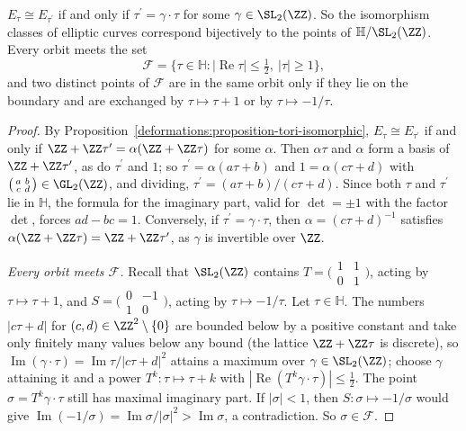 \begin{theorem}\label{deformations:theorem-elliptic-moduli}
$E_\tau \cong E_{\tau^{\prime}}$ if and only if $\tau^{\prime} = \gamma\cdot\tau$ for some $\gamma \in \SL_2(\ZZ)$. So the isomorphism classes of elliptic curves correspond bijectively to the points of
$\mathbb{H}/\SL_2(\ZZ)$. Every orbit meets the set
\[
\mathcal{F} = \{\tau \in \mathbb{H} : |\operatorname{Re}\tau| \leq \tfrac12, \ |\tau| \geq 1\},
\]
and two distinct points of $\mathcal{F}$ are in the same orbit only if they lie on the boundary and are exchanged by $\tau \mapsto \tau + 1$ or by $\tau \mapsto -1/\tau$.
\end{theorem}

\begin{proof}
By Proposition~\ref{deformations:proposition-tori-isomorphic}, $E_\tau \cong E_{\tau^{\prime}}$ if and only if $\ZZ + \ZZ\tau^{\prime} = \alpha(\ZZ + \ZZ\tau)$ for some $\alpha$. Then $\alpha\tau$ and $\alpha$ form a basis of
$\ZZ + \ZZ\tau^{\prime}$, as do $\tau^{\prime}$ and $1$; so $\tau^{\prime} = \alpha(a\tau + b)$ and $1 = \alpha(c\tau + d)$ with $\bigl(\begin{smallmatrix}a & b\\ c & d\end{smallmatrix}\bigr) \in \GL_2(\ZZ)$, and dividing,
$\tau^{\prime} = (a\tau + b)/(c\tau + d)$. Since both $\tau$ and $\tau^{\prime}$ lie in $\mathbb{H}$, the formula for the imaginary part, valid for $\det = \pm1$ with the factor $\det$, forces $ad - bc = 1$. Conversely, if
$\tau^{\prime} = \gamma\cdot\tau$, then $\alpha = (c\tau + d)^{-1}$ satisfies $\alpha(\ZZ + \ZZ\tau) = \ZZ + \ZZ\tau^{\prime}$, as $\gamma$ is invertible over $\ZZ$.

\emph{Every orbit meets $\mathcal{F}$.} Recall that $\SL_2(\ZZ)$ contains $T = \bigl(\begin{smallmatrix}1 & 1\\ 0 & 1\end{smallmatrix}\bigr)$, acting by $\tau \mapsto \tau + 1$, and
$S = \bigl(\begin{smallmatrix}0 & -1\\ 1 & 0\end{smallmatrix}\bigr)$, acting by $\tau \mapsto -1/\tau$. Let $\tau \in \mathbb{H}$. The numbers $|c\tau + d|$ for $(c, d) \in \ZZ^2 \setminus \{0\}$ are bounded below by a positive constant and take only finitely many values below
any bound (the lattice $\ZZ + \ZZ\tau$ is discrete), so $\operatorname{Im}(\gamma\cdot\tau) = \operatorname{Im}\tau/|c\tau + d|^2$ attains a maximum over $\gamma \in \SL_2(\ZZ)$; choose $\gamma$ attaining it and a
power $T^k \colon \tau \mapsto \tau + k$ with $|\operatorname{Re}(T^k\gamma\cdot\tau)| \leq \frac12$. The point $\sigma = T^k\gamma\cdot\tau$ still has maximal imaginary part. If $|\sigma| < 1$, then $S \colon \sigma \mapsto -1/\sigma$
would give $\operatorname{Im}(-1/\sigma) = \operatorname{Im}\sigma/|\sigma|^2 > \operatorname{Im}\sigma$, a contradiction. So $\sigma \in \mathcal{F}$.


\end{proof}
